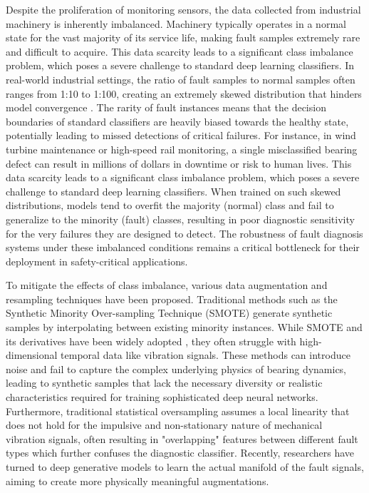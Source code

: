 Despite the proliferation of monitoring sensors, the data collected from industrial machinery is inherently imbalanced. Machinery typically operates in a normal state for the vast majority of its service life, making fault samples extremely rare and difficult to acquire. This data scarcity leads to a significant class imbalance problem, which poses a severe challenge to standard deep learning classifiers. In real-world industrial settings, the ratio of fault samples to normal samples often ranges from 1:10 to 1:100, creating an extremely skewed distribution that hinders model convergence \cite{32, 40}. The rarity of fault instances means that the decision boundaries of standard classifiers are heavily biased towards the healthy state, potentially leading to missed detections of critical failures. For instance, in wind turbine maintenance or high-speed rail monitoring, a single misclassified bearing defect can result in millions of dollars in downtime or risk to human lives. This data scarcity leads to a significant class imbalance problem, which poses a severe challenge to standard deep learning classifiers. When trained on such skewed distributions, models tend to overfit the majority (normal) class and fail to generalize to the minority (fault) classes, resulting in poor diagnostic sensitivity for the very failures they are designed to detect. The robustness of fault diagnosis systems under these imbalanced conditions remains a critical bottleneck for their deployment in safety-critical applications.

To mitigate the effects of class imbalance, various data augmentation and resampling techniques have been proposed. Traditional methods such as the Synthetic Minority Over-sampling Technique (SMOTE) \cite{6} generate synthetic samples by interpolating between existing minority instances. While SMOTE and its derivatives have been widely adopted \cite{1, 2, 5, 35}, they often struggle with high-dimensional temporal data like vibration signals. These methods can introduce noise and fail to capture the complex underlying physics of bearing dynamics, leading to synthetic samples that lack the necessary diversity or realistic characteristics required for training sophisticated deep neural networks. Furthermore, traditional statistical oversampling assumes a local linearity that does not hold for the impulsive and non-stationary nature of mechanical vibration signals, often resulting in "overlapping" features between different fault types which further confuses the diagnostic classifier. Recently, researchers have turned to deep generative models to learn the actual manifold of the fault signals, aiming to create more physically meaningful augmentations.

